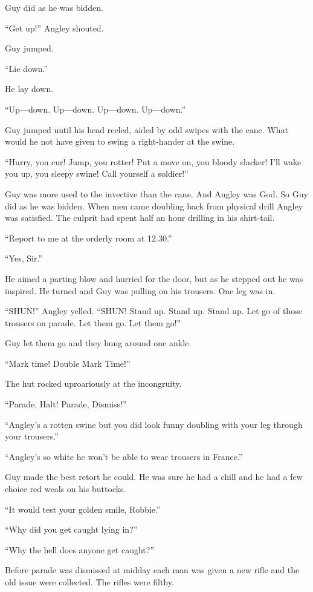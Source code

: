 Guy did as he was bidden.

``Get up!'' Angley shouted.

Guy jumped.

``Lie down.''

He lay down.

``Up---down. Up---down. Up---down. Up---down.''

Guy jumped until his head reeled, aided by odd swipes with the cane. What 
would he not have given to swing a right-hander at the swine.

``Hurry, you cur! Jump, you rotter! Put a move on, you bloody slacker! I'll 
wake you up, you sleepy swine! Call yourself a soldier!''

Guy was more used to the invective than the cane. And Angley was 
God. So Guy did as he was bidden. When men came doubling back from physical 
drill Angley was satisfied. The culprit had spent half an hour drilling 
in his shirt-tail.

``Report to me at the orderly room at 12.30.''

``Yes, Sir.''

He aimed a parting blow and hurried for the door, but as he stepped out 
he was inspired. He turned and Guy was pulling on his trousers. One leg was in. 

``SHUN!'' Angley yelled. ``SHUN! Stand up. Stand up. Stand up. Let go of those 
trousers on parade. Let them go. Let them go!''

Guy let them go and they hung around one ankle.

``Mark time! Double Mark Time!''

The hut rocked uproariously at the incongruity.

``Parade, Halt! Parade, Dismiss!''

``Angley's a rotten swine but you did look funny doubling with your leg through 
your trousers.''

``Angley's so white he won't be able to wear trousers in France.''

Guy made the best retort he could. He was sure he had a chill and he had 
a few choice red weals on his buttocks.

``It would test your golden smile, Robbie.''

``Why did you get caught lying in?''

``Why the hell does anyone get caught?''

Before parade was dismissed at midday each man was given a new rifle and 
the old issue were collected. The rifles were filthy.

